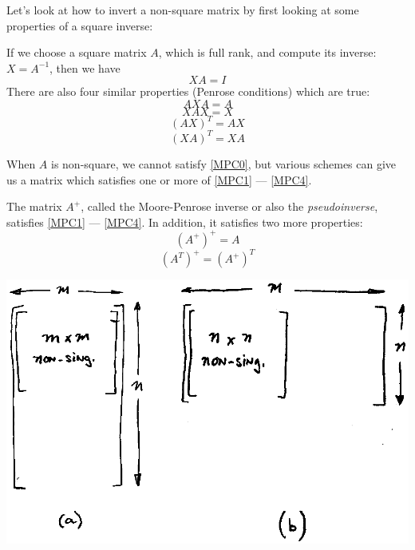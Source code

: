 Let's look at how to invert a non-square matrix by first looking at some
properties of a square inverse:

If we choose a square matrix $A$, which is full rank, and compute its
inverse: $X = A^{-1}$, then we have
\begin{equation}\label{MPC0}
X A = I
\end{equation}
There are also four similar properties (Penrose conditions) which are
true:
\begin{equation} \label{MPC1}
AXA = A
\end{equation}
\begin{equation}\label{MPC2}
XAX = X
\end{equation}
\begin{equation}\label{MPC3}
(AX)^{T} = AX
\end{equation}
\begin{equation}\label{MPC4}
(XA)^{T} = XA
\end{equation}

When $A$ is non-square, we cannot satisfy \ref{MPC0}, but various
schemes can give us a matrix which satisfies one or more of
\ref{MPC1} --- \ref{MPC4}.

The matrix $A^{+}$, called the Moore-Penrose inverse or also the
{\it pseudoinverse}, satisfies \ref{MPC1} --- \ref{MPC4}.
In addition, it satisfies two more properties:
\begin{equation} \label{MPC5}
(A^{+})^{+} = A
\end{equation}
\begin{equation}\label{MPC6}
(A^T)^{+} = (A^{+})^T
\end{equation}


  \includegraphics[width=5.5in]{figs13/00096.eps}

